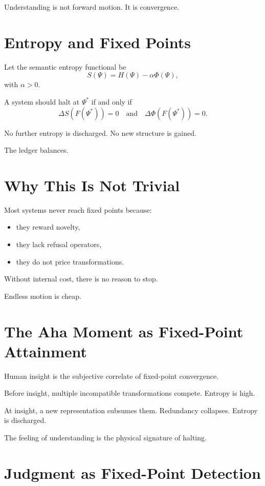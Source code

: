 \documentclass[11pt]{book}
\begin{document}
Understanding is not forward motion.
It is convergence.

\section{Entropy and Fixed Points}

Let the semantic entropy functional be
\[
S(\Psi) = H(\Psi) - \alpha \Phi(\Psi),
\]
with \(\alpha > 0\).

\begin{proposition}
A system should halt at \(\Psi^\ast\) if and only if
\[
\Delta S(F(\Psi^\ast)) = 0
\quad \text{and} \quad
\Delta \Phi(F(\Psi^\ast)) = 0.
\]
\end{proposition}

No further entropy is discharged.
No new structure is gained.

The ledger balances.

\section{Why This Is Not Trivial}

Most systems never reach fixed points because:

\begin{itemize}
\item they reward novelty,
\item they lack refusal operators,
\item they do not price transformations.
\end{itemize}

Without internal cost, there is no reason to stop.

Endless motion is cheap.

\section{The Aha Moment as Fixed-Point Attainment}

Human insight is the subjective correlate of fixed-point convergence.

Before insight, multiple incompatible transformations compete.
Entropy is high.

At insight, a new representation subsumes them.
Redundancy collapses.
Entropy is discharged.

The feeling of understanding is the physical signature of halting.

\section{Judgment as Fixed-Point Detection}
\end{document}
